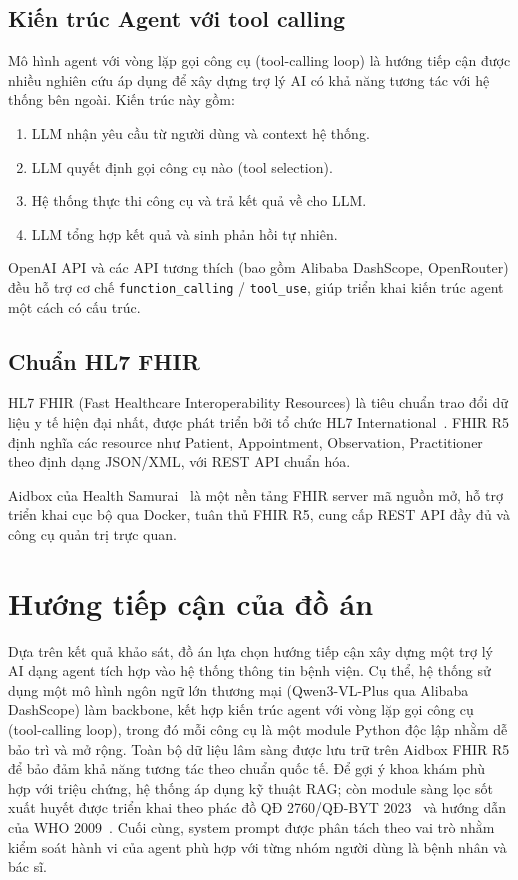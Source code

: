\documentclass[a4paper,13pt,3p,oneside]{report}
\theoremstyle{definition}
\theoremstyle{remark}
\theoremstyle{definition}
\begin{document}
\subsection{Kiến trúc Agent với tool calling}

Mô hình agent với vòng lặp gọi công cụ (tool-calling loop) là hướng tiếp cận được nhiều nghiên cứu áp dụng để xây dựng trợ lý AI có khả năng tương tác với hệ thống bên ngoài. Kiến trúc này gồm:

\begin{enumerate}
  \item LLM nhận yêu cầu từ người dùng và context hệ thống.
  \item LLM quyết định gọi công cụ nào (tool selection).
  \item Hệ thống thực thi công cụ và trả kết quả về cho LLM.
  \item LLM tổng hợp kết quả và sinh phản hồi tự nhiên.
\end{enumerate}

OpenAI API và các API tương thích (bao gồm Alibaba DashScope, OpenRouter) đều hỗ trợ cơ chế \texttt{function\_calling} / \texttt{tool\_use}, giúp triển khai kiến trúc agent một cách có cấu trúc.

\subsection{Chuẩn HL7 FHIR}

HL7 FHIR (Fast Healthcare Interoperability Resources) là tiêu chuẩn trao đổi dữ liệu y tế hiện đại nhất, được phát triển bởi tổ chức HL7 International~\cite{fhir-r5}. FHIR R5 định nghĩa các resource như Patient, Appointment, Observation, Practitioner theo định dạng JSON/XML, với REST API chuẩn hóa.

Aidbox của Health Samurai~\cite{aidbox} là một nền tảng FHIR server mã nguồn mở, hỗ trợ triển khai cục bộ qua Docker, tuân thủ FHIR R5, cung cấp REST API đầy đủ và công cụ quản trị trực quan.

\section{Hướng tiếp cận của đồ án}

Dựa trên kết quả khảo sát, đồ án lựa chọn hướng tiếp cận xây dựng một trợ lý AI dạng agent tích hợp vào hệ thống thông tin bệnh viện. Cụ thể, hệ thống sử dụng một mô hình ngôn ngữ lớn thương mại (Qwen3-VL-Plus qua Alibaba DashScope) làm backbone, kết hợp kiến trúc agent với vòng lặp gọi công cụ (tool-calling loop), trong đó mỗi công cụ là một module Python độc lập nhằm dễ bảo trì và mở rộng. Toàn bộ dữ liệu lâm sàng được lưu trữ trên Aidbox FHIR R5 để bảo đảm khả năng tương tác theo chuẩn quốc tế. Để gợi ý khoa khám phù hợp với triệu chứng, hệ thống áp dụng kỹ thuật RAG; còn module sàng lọc sốt xuất huyết được triển khai theo phác đồ QĐ 2760/QĐ-BYT 2023~\cite{qd2760} và hướng dẫn của WHO 2009~\cite{who2009}. Cuối cùng, system prompt được phân tách theo vai trò nhằm kiểm soát hành vi của agent phù hợp với từng nhóm người dùng là bệnh nhân và bác sĩ.
\end{document}
